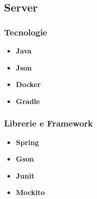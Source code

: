 \subsection{Server}

\subsubsection{Tecnologie}

\begin{itemize}
	\item \textbf{Java}
	\item \textbf{Json}
	\item \textbf{Docker}
	\item \textbf{Gradle}
\end{itemize}

\subsubsection{Librerie e Framework}

\begin{itemize}
	\item \textbf{Spring}
	\item \textbf{Gson}
	\item \textbf{Junit}
	\item \textbf{Mockito}

\end{itemize}